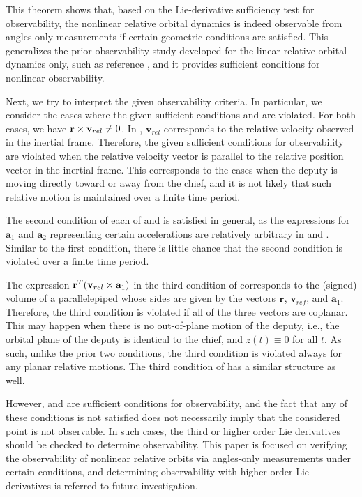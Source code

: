 This theorem shows that, based on the Lie-derivative sufficiency test for observability, the nonlinear relative orbital dynamics is indeed observable from angles-only measurements if certain geometric conditions are satisfied. This generalizes the prior observability study developed for the linear relative orbital dynamics only, such as reference \cite{WofGelITAES09}, and it provides sufficient conditions for nonlinear observability. 

Next, we try to interpret the given observability criteria. In particular, we consider the cases where the given sufficient conditions  and  are violated. For both cases, we have $\mathbf{r}\times\mathbf{v}_{rel}\neq 0$. In , $\mathbf{v}_{rel}$ corresponds to the relative velocity observed in the inertial frame. Therefore, the given sufficient conditions for observability are violated when the relative velocity vector is parallel to the relative position vector in the inertial frame. This corresponds to the cases when the deputy is moving directly toward or away from the chief, and it is not likely that such relative motion is maintained over a finite time period.

The second condition of each of  and  is satisfied in general, as the expressions for $\mathbf{a}_1$ and $\mathbf{a}_2$ representing certain accelerations are relatively arbitrary in  and . Similar to the first condition, there is little chance that the second condition is violated over a finite time period.

The expression $\mathbf{r}^T(\mathbf{v}_{rel}\times \mathbf{a}_1)$ in the third condition of  corresponds to the (signed) volume of a parallelepiped whose sides are given by the vectors $\mathbf{r}$, $\mathbf{v}_{ref}$, and $\mathbf{a}_1$. Therefore, the third condition is violated if all of the three vectors are coplanar. This may happen when there is no out-of-plane motion of the deputy, i.e., the orbital plane of the deputy is identical to the chief, and $z(t)\equiv 0$ for all $t$. As such, unlike the prior two conditions, the third condition is violated always for any planar relative motions. The third condition of  has a similar structure as well.

However,  and  are sufficient conditions for observability, and the fact that any of these conditions is not satisfied does not necessarily imply that the considered point is not observable. In such cases, the third or higher order Lie derivatives should be checked to determine observability. This paper is focused on verifying the observability of nonlinear relative orbits via angles-only measurements under certain conditions, and determining observability with higher-order Lie derivatives is referred to future investigation.


